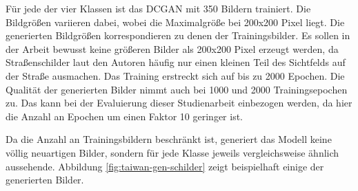 Für jede der vier Klassen ist das DCGAN mit 350 Bildern trainiert. Die Bildgrößen variieren dabei, wobei die Maximalgröße bei 200x200 Pixel liegt. Die generierten Bildgrößen korrespondieren zu denen der Trainingsbilder. Es sollen in der Arbeit bewusst keine größeren Bilder als 200x200 Pixel erzeugt werden, da Straßenschilder laut den Autoren häufig nur einen kleinen Teil des Sichtfelds auf der Straße ausmachen.
Das Training erstreckt sich auf bis zu 2000 Epochen. Die Qualität der generierten Bilder nimmt auch bei 1000 und 2000 Trainingsepochen zu. Das kann bei der Evaluierung dieser Studienarbeit einbezogen werden, da hier die Anzahl an Epochen um einen Faktor 10 geringer ist. \cite{taiwanGAN}

Da die Anzahl an Trainingsbildern beschränkt ist, generiert das Modell keine völlig neuartigen Bilder, sondern für jede Klasse jeweils vergleichsweise ähnlich aussehende. Abbildung \ref{fig:taiwan-gen-schilder} zeigt beispielhaft einige der generierten Bilder. \cite{taiwanGAN}

